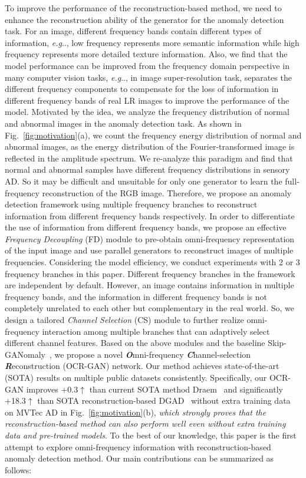 \documentclass[lettersize,journal]{IEEEtran}
\makeatletter
\DeclareRobustCommand\onedot{\futurelet\@let@token\@onedot}
\def\@onedot{\ifx\@let@token.\else.\null\fi\xspace}
\def\eg{\emph{e.g}\onedot} \def\Eg{\emph{E.g}\onedot}
\makeatother
\begin{document}
To improve the performance of the reconstruction-based method, we need to enhance the reconstruction ability of the generator for the anomaly detection task. For an image, different frequency bands contain different types of information, \eg, low frequency represents more semantic information while high frequency represents more detailed texture information. Also, we find that the model performance can be improved from the frequency domain perspective in many computer vision tasks, \eg, in image super-resolution task, \cite{li2020learning} separates the different frequency components to compensate for the loss of information in different frequency bands of real LR images to improve the performance of the model. Motivated by the idea, we analyze the frequency distribution of normal and abnormal images in the anomaly detection task. As shown in Fig.~\ref{fig:motivation}(a), we count the frequency energy distribution of normal and abnormal images, as the energy distribution of the Fourier-transformed image is reflected in the amplitude spectrum. We re-analyze this paradigm and find that normal and abnormal samples have different frequency distributions in sensory AD. So it may be difficult and unsuitable for only one generator to learn the full-frequency reconstruction of the RGB image. Therefore, we propose an anomaly detection framework using multiple frequency branches to reconstruct information from different frequency bands respectively. In order to differentiate the use of information from different frequency bands, we propose an effective \emph{Frequency Decoupling} (FD) module to pre-obtain omni-frequency representation of the input image and use parallel generators to reconstruct images of multiple frequencies. Considering the model efficiency, we conduct experiments with 2 or 3 frequency branches in this paper. Different frequency branches in the framework are independent by default. However, an image contains information in multiple frequency bands, and the information in different frequency bands is not completely unrelated to each other but complementary in the real world. So, we design a tailored \emph{Channel Selection} (CS) module to further realize omni-frequency interaction among multiple branches that can adaptively select different channel features. Based on the above modules and the baseline Skip-GANomaly~\cite{akccay2019skip}, we propose a novel \textit{\textbf{O}}mni-frequency \textit{\textbf{C}}hannel-selection \textit{\textbf{R}}econstruction (OCR-GAN) network. Our method achieves state-of-the-art (SOTA) results on multiple public datasets consistently. Specifically, our OCR-GAN improves +0.3$\uparrow$ than current SOTA method Draem~\cite{zavrtanik2021draem} and significantly +18.3$\uparrow$ than SOTA reconstruction-based DGAD~\cite{xia2021discriminative} without extra training data on MVTec AD in Fig.~\ref{fig:motivation}(b), \emph{which strongly proves that the reconstruction-based method can also perform well even without extra training data and pre-trained models}. To the best of our knowledge, this paper is the first attempt to explore omni-frequency information with reconstruction-based anomaly detection method. Our main contributions can be summarized as follows:
\end{document}
